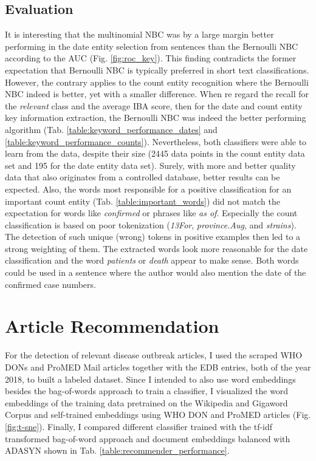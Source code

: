 \subsection{Evaluation}
  It is interesting that the multinomial NBC was by a large margin better performing in the date entity selection from sentences than the Bernoulli NBC according to the AUC (Fig. \ref{fig:roc_key}).
  This finding contradicts the former expectation that Bernoulli NBC is typically preferred in short text classifications.
  However, the contrary applies to the count entity recognition where the Bernoulli NBC indeed is better, yet with a smaller difference.
  When re regard the recall for the \textsl{relevant} class and the average IBA score, then for the date and count entity key information extraction, the Bernoulli NBC was indeed the better performing algorithm (Tab. \ref{table:keyword_performance_dates} and \ref{table:keyword_performance_counts}).
  Nevertheless, both classifiers were able to learn from the data, despite their size (2445 data points in the count entity data set and 195 for the date entity data set).
  Surely, with more and better quality data that also originates from a controlled database, better results can be expected.
  Also, the words most responsible for a positive classification for an important count entity (Tab. \ref{table:important_words}) did not match the expectation for words like \textit{confirmed} or phrases like \textit{as of}.
  Especially the count classification is based on poor tokenization (\textit{13For}, \textit{province.Aug}, and \textit{strains}).
  The detection of such unique (wrong) tokens in positive examples then led to a strong weighting of them.
  The extracted words look more reasonable for the date classification and the word \textit{patients} or \textit{death} appear to make sense.
  Both words could be used in a sentence where the author would also mention the date of the confirmed case numbers.

\section{Article Recommendation}
  For the detection of relevant disease outbreak articles, I used the scraped WHO DONs and ProMED Mail articles together with the EDB entries, both of the year 2018, to built a labeled dataset.
  Since I intended to also use word embeddings besides the bag-of-words approach to train a classifier, I visualized the word embeddings of the training data pretrained on the Wikipedia and Gigaword Corpus and self-trained embeddings using WHO DON and ProMED articles (Fig. \ref{fig:t-sne}).
  Finally, I compared different classifier trained with the tf-idf transformed bag-of-word approach and document embeddings balanced with ADASYN shown in Tab. \ref{table:recommender_performance}.

